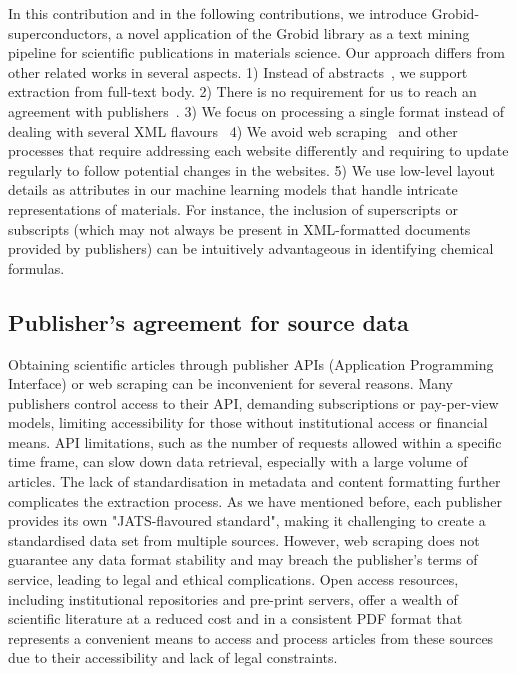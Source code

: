 In this contribution and in the following contributions, we introduce Grobid-superconductors, a novel application of the Grobid library as a text mining pipeline for scientific publications in materials science.
Our approach differs from other related works in several aspects. 
1) Instead of abstracts~\cite{mitsui2023automatic}, we support extraction from full-text body.
2) There is no requirement for us to reach an agreement with publishers~\cite{kononova2019text}.
3) We focus on processing a single format instead of dealing with several XML flavours~\cite{kononova2019text}
4) We avoid web scraping~\cite{court2020magnetic} and other processes that require addressing each website differently and requiring to update regularly to follow potential changes in the websites.
5) We use low-level layout details as attributes in our machine learning models that handle intricate representations of materials. For instance, the inclusion of superscripts or subscripts (which may not always be present in XML-formatted documents provided by publishers) can be intuitively advantageous in identifying chemical formulas.

\subsection{Publisher's agreement for source data}
Obtaining scientific articles through publisher APIs (Application Programming Interface) or web scraping can be inconvenient for several reasons. 
Many publishers control access to their API, demanding subscriptions or pay-per-view models, limiting accessibility for those without institutional access or financial means. 
API limitations, such as the number of requests allowed within a specific time frame, can slow down data retrieval, especially with a large volume of articles. The lack of standardisation in metadata and content formatting further complicates the extraction process.
As we have mentioned before, each publisher provides its own "JATS-flavoured standard", making it challenging to create a standardised data set from multiple sources. 
However, web scraping does not guarantee any data format stability and may breach the publisher's terms of service, leading to legal and ethical complications.
Open access resources, including institutional repositories and pre-print servers, offer a wealth of scientific literature at a reduced cost and in a consistent PDF format that represents a convenient means to access and process articles from these sources due to their accessibility and lack of legal constraints.

